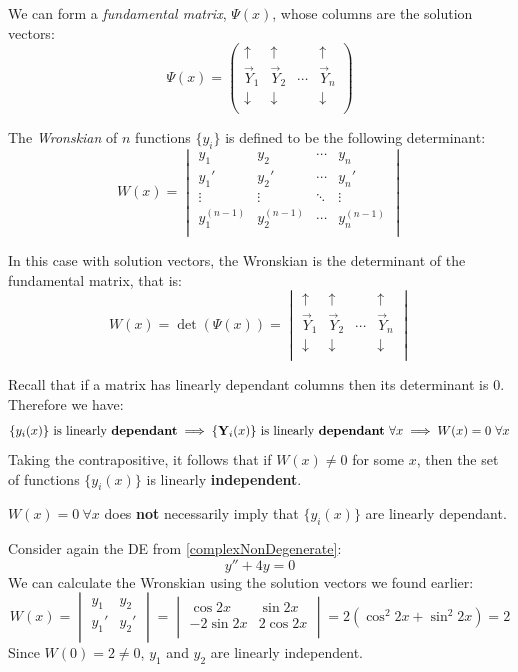 \documentclass[../main.tex]{subfiles}
\begin{document}
We can form a \textit{fundamental matrix}, $\Psi(x)$, whose columns are the solution vectors:
\[
  \Psi(x) = \begin{pmatrix}
  \uparrow & \uparrow &  & \uparrow \\
  \vec{Y}_1 & \vec{Y}_2 & \cdots & \vec{Y}_n \\
  \downarrow & \downarrow &  & \downarrow \\
  \end{pmatrix}
\]
\begin{definition}[Wronskian]
  The \textit{Wronskian} of $n$ functions $\{y_i\}$ is defined to be the following determinant:
  \[
    W(x) =
    \begin{vmatrix}
      y_1 & y_2 & \cdots & y_n \\
      y_1' & y_2' & \cdots & y_n' \\
      \vdots & \vdots & \ddots & \vdots \\
      y^{(n-1)}_1 & y^{(n-1)}_2 & \cdots & y^{(n-1)}_n \\
    \end{vmatrix}
  \]
\end{definition}
\begin{remark}[Note]
  In this case with solution vectors, the Wronskian is the determinant of the fundamental matrix, that is:
  \[
    W(x) =
    \det(\Psi(x)) =
    \begin{vmatrix}
      \uparrow & \uparrow &  & \uparrow \\
      \vec{Y}_1 & \vec{Y}_2 & \cdots  & \vec{Y}_n \\
      \downarrow & \downarrow &  & \downarrow \\
    \end{vmatrix}
  \]
\end{remark}
Recall that if a matrix has linearly dependant columns then its determinant is 0.
Therefore we have:
\[
  \{y_i(x)\} \text{ is linearly \textbf{dependant}} \implies \{\vec{Y}_i(x)\} \text{ is linearly \textbf{dependant}}\ \forall x \implies W(x) = 0\ \forall x
\]
Taking the contrapositive, it follows that if $W(x) \neq 0$ for some $x$, then the set of functions $\{y_i(x)\}$ is linearly \textbf{independent}.
\begin{remark}[Warning]
  $W(x) = 0\ \forall x$  does \textbf{not} necessarily imply that $\{y_i(x)\}$ are linearly dependant.
\end{remark}
\begin{example}
  \label{wronskianExample}
  Consider again the DE from \cref{complexNonDegenerate}:
  \[
    y'' + 4y = 0
  \]
  We can calculate the Wronskian using the solution vectors we found earlier:
  \[
    W(x) = \begin{vmatrix}
    y_1 & y_2 \\
    y_1' & y_2' \\
    \end{vmatrix} = \begin{vmatrix}
    \cos 2x & \sin2x \\
    -2\sin 2x & 2\cos 2x \\
    \end{vmatrix}
    = 2(\cos^2 2x + \sin^2 2x) = 2
  \]
  Since $W(0) = 2 \neq 0$, $y_1$ and $y_2$ are linearly independent.
\end{example}
\end{document}
